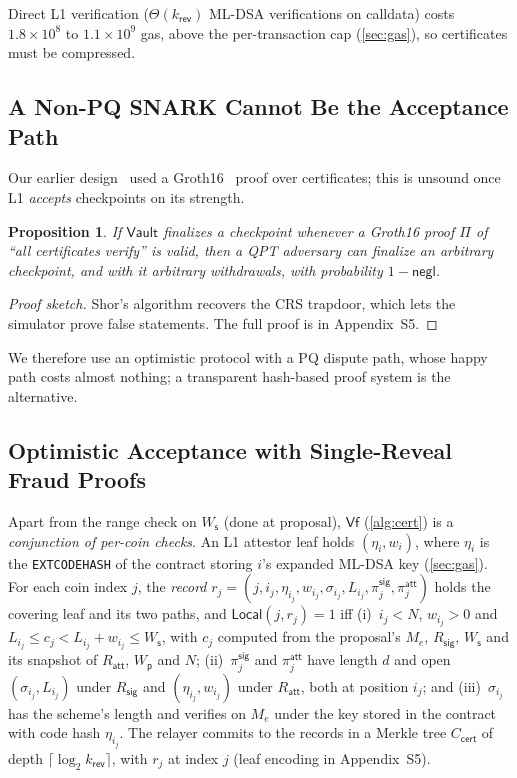 \documentclass[10pt,journal,compsoc]{IEEEtran}
\theoremstyle{tplain}
\newtheorem{proposition}[theorem]{Proposition}
\theoremstyle{tdef}
\theoremstyle{remark}
\newcommand{\supp}[1]{Appendix~#1}
\newcommand{\negl}{\mathsf{negl}}
\newcommand{\Ws}{W_{\mathsf{s}}}
\newcommand{\Wp}{W_{\mathsf{p}}}
\newcommand{\Rsig}{R_{\mathsf{sig}}}
\newcommand{\Ratt}{R_{\mathsf{att}}}
\newcommand{\kr}{k_{\mathsf{rev}}}
\newcommand{\cert}{\mathsf{cert}}
\newcommand{\Vault}{\mathsf{Vault}}
\begin{document}
Direct L1 verification ($\Theta(\kr)$ ML-DSA verifications on calldata) costs $1.8\times10^{8}$ to $1.1\times10^{9}$ gas, above the per-transaction cap (\cref{sec:gas}), so certificates must be compressed.

\subsection{A Non-PQ SNARK Cannot Be the Acceptance Path}
Our earlier design~\cite{myeprint} used a Groth16~\cite{groth16} proof over certificates; this is unsound once L1 \emph{accepts} checkpoints on its strength.

\begin{proposition}\label{prop:snark}
If $\Vault$ finalizes a checkpoint whenever a Groth16 proof $\Pi$ of ``all certificates verify'' is valid, then a QPT adversary can finalize an arbitrary checkpoint, and with it arbitrary withdrawals, with probability $1-\negl$.
\end{proposition}
\begin{proof}[Proof sketch]
Shor's algorithm recovers the CRS trapdoor, which lets the simulator prove false statements. The full proof is in \supp{S5}.
\end{proof}

\noindent We therefore use an optimistic protocol with a PQ dispute path, whose happy path costs almost nothing; a transparent hash-based proof system is the alternative.

\subsection{Optimistic Acceptance with Single-Reveal Fraud Proofs}
Apart from the range check on $\Ws$ (done at proposal), $\mathsf{Vf}$ (\cref{alg:cert}) is a \emph{conjunction of per-coin checks}. An L1 attestor leaf holds $(\eta_i,w_i)$, where $\eta_i$ is the \texttt{EXTCODEHASH} of the contract storing $i$'s expanded ML-DSA key (\cref{sec:gas}). For each coin index $j$, the \emph{record} $r_j=(j,i_j,\eta_{i_j},w_{i_j},\sigma_{i_j},L_{i_j},\pi^{\mathsf{sig}}_{j},\pi^{\mathsf{att}}_{j})$ holds the covering leaf and its two paths, and $\mathsf{Local}(j,r_j)=1$ iff
(i)~$i_j<N$, $w_{i_j}>0$ and $L_{i_j}\le c_j<L_{i_j}+w_{i_j}\le \Ws$, with $c_j$ computed from the proposal's $M_e$, $\Rsig$, $\Ws$ and its snapshot of $\Ratt$, $\Wp$ and $N$;
(ii)~$\pi^{\mathsf{sig}}_j$ and $\pi^{\mathsf{att}}_j$ have length $d$ and open $(\sigma_{i_j},L_{i_j})$ under $\Rsig$ and $(\eta_{i_j},w_{i_j})$ under $\Ratt$, both at position $i_j$; and
(iii)~$\sigma_{i_j}$ has the scheme's length and verifies on $M_e$ under the key stored in the contract with code hash $\eta_{i_j}$.
The relayer commits to the records in a Merkle tree $C_{\cert}$ of depth $\lceil\log_2\kr\rceil$, with $r_j$ at index $j$ (leaf encoding in \supp{S5}).
\end{document}
